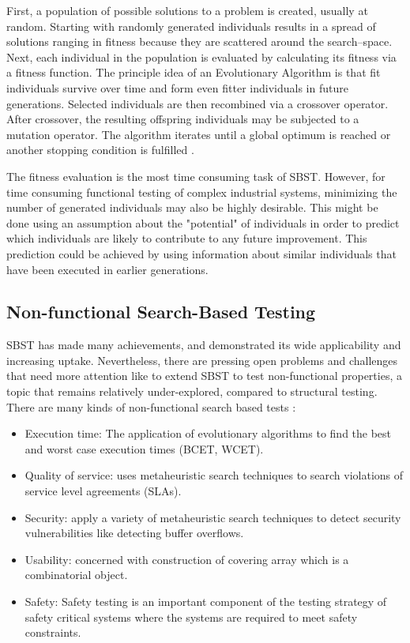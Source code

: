 First, a population of possible solutions to a problem
is created, usually at random. Starting with randomly
generated individuals results in a spread of solutions ranging in fitness because they are scattered around the search–space. Next, each individual in the population is evaluated by calculating its fitness via a fitness function. The principle idea of an Evolutionary Algorithm is that fit individuals survive over time and form even fitter individuals in future
generations. Selected individuals are then recombined
via a crossover operator. After crossover, the resulting offspring individuals may be subjected to a mutation operator. The algorithm iterates until a global optimum is reached or another stopping condition is fulfilled \cite{Baars2011}. 

The fitness evaluation is the most
time consuming task of SBST. However, for time consuming functional testing of complex industrial systems, minimizing
the number of generated individuals may also be highly desirable. This might be done using an assumption about
the "potential" of individuals in order to predict which individuals are likely to contribute to any future improvement.
This prediction could be achieved by using information about similar individuals that have been executed in earlier generations.



\subsection{Non-functional Search-Based Testing}

SBST has made many achievements, and demonstrated its wide applicability and increasing uptake. Nevertheless, there are pressing open problems and challenges that need more attention like to extend SBST to test non-functional properties, a topic that remains relatively under-explored, compared to structural testing. There are many kinds of non-functional search based tests  \cite{Afzal2009a}:

\begin{itemize}
\item Execution time: The application of evolutionary algorithms to find the best and worst case execution times (BCET, WCET).
\item Quality of service: uses metaheuristic search techniques to search violations of service level agreements (SLAs).
\item Security: apply a variety of metaheuristic search techniques  to detect security vulnerabilities like detecting buffer overflows.
\item Usability: concerned with construction of covering array which is a combinatorial object.
\item Safety: Safety testing is an important component of the testing strategy of safety critical systems where the systems are required to meet safety constraints.
\end{itemize}

